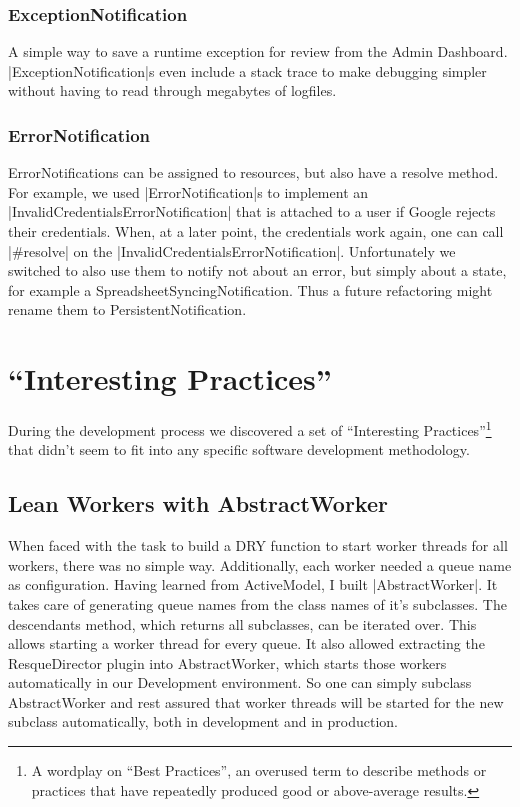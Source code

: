 \subsubsection{ExceptionNotification}

A simple way to save a runtime exception for review from the Admin Dashboard. |ExceptionNotification|s even include a stack trace to make debugging simpler without having to read through megabytes of logfiles.

\subsubsection{ErrorNotification}

ErrorNotifications can be assigned to resources, but also have a resolve method. For example, we used |ErrorNotification|s to implement an |InvalidCredentialsErrorNotification| that is attached to a user if Google rejects their credentials. When, at a later point, the credentials work again, one can call |#resolve| on the |InvalidCredentialsErrorNotification|.
Unfortunately we switched to also use them to notify not about an error, but simply about a state, for example a SpreadsheetSyncingNotification. Thus a future refactoring might rename them to PersistentNotification.

\section{``Interesting Practices''}

During the development process we discovered a set of ``Interesting Practices''\footnote{A wordplay on ``Best Practices'', an overused term to describe methods or practices that have repeatedly produced good or above-average results.} that didn't seem to fit into any specific software development methodology.

\subsection{Lean Workers with AbstractWorker}

When faced with the task to build a DRY function to start worker threads for all workers, there was no simple way. Additionally, each worker needed a queue name as configuration. Having learned from ActiveModel, I built |AbstractWorker|. It takes care of generating queue names from the class names of it’s subclasses. The descendants method, which returns all subclasses, can be iterated over. This allows starting a worker thread for every queue. It also allowed extracting the ResqueDirector plugin into AbstractWorker, which starts those workers automatically in our Development environment. So one can simply subclass AbstractWorker and rest assured that worker threads will be started for the new subclass automatically, both in development and in production.

